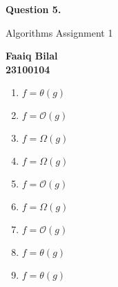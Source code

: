 \documentclass[]{article}
\begin{document}
\begin{center}
    \vspace*{1cm}

    \textbf{Question 5.}

    \vspace{0.5cm}
     Algorithms Assignment 1

    \vspace{0.15cm}

    \textbf{Faaiq Bilal} \\ 
    \textbf{23100104}
         
\end{center}

\begin{enumerate}
    \item $f = \theta (g)$
    \item $f = \mathcal{O} (g)$
    \item $f = \Omega (g) $
    \item $f = \Omega (g) $
    \item $f = \mathcal{O} (g)$
    \item $f = \Omega (g)$
    \item $f = \mathcal{O} (g)$
    \item $f = \theta (g)$
    \item $f = \theta (g)$
\end{enumerate}
    
\end{document}
